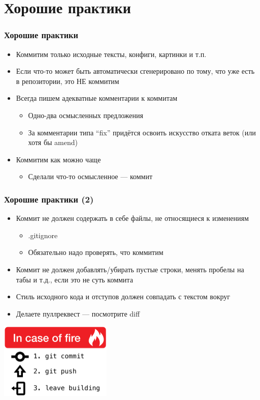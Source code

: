 \documentclass[xetex,mathserif,serif]{beamer}
\begin{document}
	\section{Хорошие практики}

	\begin{frame}
		\frametitle{Хорошие практики}
		\begin{itemize}
			\item Коммитим только исходные тексты, конфиги, картинки и т.п.
			\item Если что-то может быть автоматически сгенерировано по тому, что уже есть в репозитории, это НЕ коммитим
			\item Всегда пишем адекватные комментарии к коммитам
			\begin{itemize}
				\item Одно-два осмысленных предложения
				\item За комментарии типа ``fix'' придётся освоить искусство отката веток (или хотя бы amend)
			\end{itemize}
			\item Коммитим как можно чаще
			\begin{itemize}
				\item Сделали что-то осмысленное --- коммит
			\end{itemize}
		\end{itemize}
	\end{frame}

	\begin{frame}
		\frametitle{Хорошие практики (2)}
		\begin{itemize}
			\item Коммит не должен содержать в себе файлы, не относящиеся к изменениям
			\begin{itemize}
				\item .gitignore
				\item Обязательно надо проверять, что коммитим
			\end{itemize}
			\item Коммит не должен добавлять/убирать пустые строки, менять пробелы на табы и т.д., если это не суть коммита
			\item Стиль исходного кода и отступов должен совпадать с текстом вокруг
			\item Делаете пуллреквест --- посмотрите diff
		\end{itemize}
		\begin{center}
			\includegraphics[width=0.4\textwidth]{inCaseOfFire.png}
		\end{center}
	\end{frame}
\end{document}
